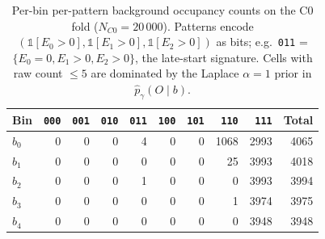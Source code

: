 \begin{table}[h]
\centering
\caption{Per-bin per-pattern background occupancy counts on the C0 fold ($N_{C0}=20\,000$). Patterns encode $(\mathbb{1}[E_0>0],\mathbb{1}[E_1>0],\mathbb{1}[E_2>0])$ as bits; e.g.\ \texttt{011} = $\{E_0=0, E_1>0, E_2>0\}$, the late-start signature. Cells with raw count $\le 5$ are dominated by the Laplace $\alpha=1$ prior in $\hat p_\gamma(O\mid b)$.}
\label{tab:occupancy_counts}
\begin{tabular}{lrrrrrrrrr}
\toprule
Bin & \texttt{000} & \texttt{001} & \texttt{010} & \texttt{011} & \texttt{100} & \texttt{101} & \texttt{110} & \texttt{111} & Total \\
\midrule
$b_0$ & 0 & 0 & 0 & 4 & 0 & 0 & 1068 & 2993 & 4065 \\
$b_1$ & 0 & 0 & 0 & 0 & 0 & 0 & 25 & 3993 & 4018 \\
$b_2$ & 0 & 0 & 0 & 1 & 0 & 0 & 0 & 3993 & 3994 \\
$b_3$ & 0 & 0 & 0 & 0 & 0 & 0 & 1 & 3974 & 3975 \\
$b_4$ & 0 & 0 & 0 & 0 & 0 & 0 & 0 & 3948 & 3948 \\
\bottomrule
\end{tabular}
\end{table}
